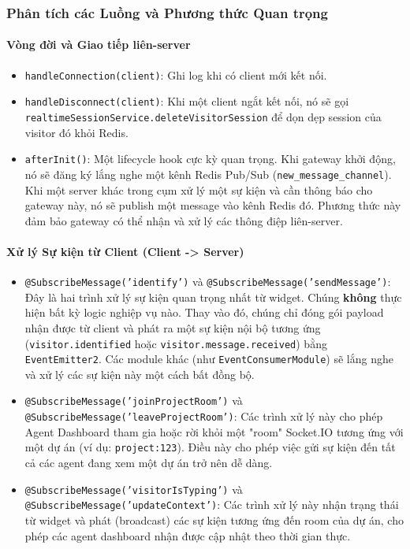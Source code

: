 \subsubsection{Phân tích các Luồng và Phương thức Quan trọng}

\paragraph{Vòng đời và Giao tiếp liên-server}
\begin{itemize}
    \item \texttt{handleConnection(client)}: Ghi log khi có client mới kết nối.
    \item \texttt{handleDisconnect(client)}: Khi một client ngắt kết nối, nó sẽ gọi \texttt{realtimeSessionService.deleteVisitorSession} để dọn dẹp session của visitor đó khỏi Redis.
    \item \texttt{afterInit()}: Một lifecycle hook cực kỳ quan trọng. Khi gateway khởi động, nó sẽ đăng ký lắng nghe một kênh Redis Pub/Sub (\texttt{new\_message\_channel}). Khi một server khác trong cụm xử lý một sự kiện và cần thông báo cho gateway này, nó sẽ publish một message vào kênh Redis đó. Phương thức này đảm bảo gateway có thể nhận và xử lý các thông điệp liên-server.
\end{itemize}

\paragraph{Xử lý Sự kiện từ Client (Client -> Server)}
\begin{itemize}
    \item \texttt{@SubscribeMessage('identify')} và \texttt{@SubscribeMessage('sendMessage')}: Đây là hai trình xử lý sự kiện quan trọng nhất từ widget. Chúng \textbf{không} thực hiện bất kỳ logic nghiệp vụ nào. Thay vào đó, chúng chỉ đóng gói payload nhận được từ client và phát ra một sự kiện nội bộ tương ứng (\texttt{visitor.identified} hoặc \texttt{visitor.message.received}) bằng \texttt{EventEmitter2}. Các module khác (như \texttt{EventConsumerModule}) sẽ lắng nghe và xử lý các sự kiện này một cách bất đồng bộ.
    
    \item \texttt{@SubscribeMessage('joinProjectRoom')} và \texttt{@SubscribeMessage('leaveProjectRoom')}: Các trình xử lý này cho phép Agent Dashboard tham gia hoặc rời khỏi một "room" Socket.IO tương ứng với một dự án (ví dụ: \texttt{project:123}). Điều này cho phép việc gửi sự kiện đến tất cả các agent đang xem một dự án trở nên dễ dàng.
    
    \item \texttt{@SubscribeMessage('visitorIsTyping')} và \texttt{@SubscribeMessage('updateContext')}: Các trình xử lý này nhận trạng thái từ widget và phát (broadcast) các sự kiện tương ứng đến room của dự án, cho phép các agent dashboard nhận được cập nhật theo thời gian thực.
\end{itemize}

